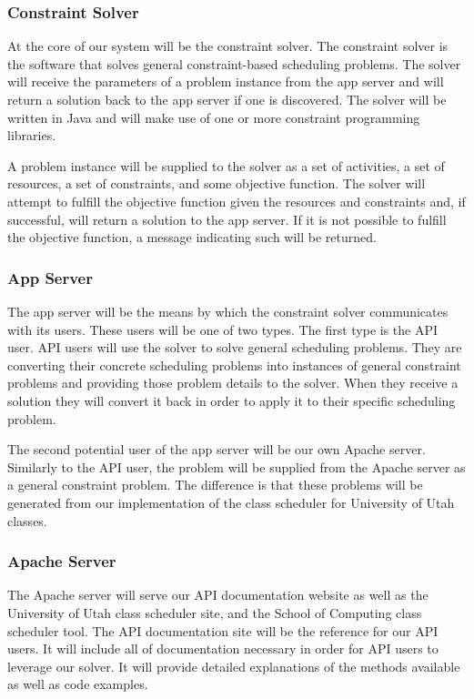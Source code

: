 \documentclass{extarticle}
\begin{document}
\subsubsection{Constraint Solver}
At the core of our system will be the constraint solver.  The constraint solver is the software that solves general
constraint-based scheduling problems.  The solver will receive the parameters of a problem instance from the app
server and will return a solution back to the app server if one is discovered.  The solver will be written in Java
and will make use of one or more constraint programming libraries.

A problem instance will be supplied to the solver as a set of activities, a set of resources, a set of constraints,
and some objective function.  The solver will attempt to fulfill the objective function given the resources and
constraints and, if successful, will return a solution to the app server.  If it is not possible to fulfill the
objective function, a message indicating such will be returned.

\subsubsection{App Server}
The app server will be the means by which the constraint solver communicates with its users.  These users will be
one of two types.  The first type is the API user.  API users will use the solver to solve general scheduling
problems.  They are converting their concrete scheduling problems into instances of general constraint problems and
providing those problem details to the solver.  When they receive a solution they will convert it back in order to
apply it to their specific scheduling problem.

The second potential user of the app server will be our own Apache server.  Similarly to the API user, the problem
will be supplied from the Apache server as a general constraint problem.  The difference is that these problems will
be generated from our implementation of the class scheduler for University of Utah classes.

\subsubsection{Apache Server}
The Apache server will serve our API documentation website as well as the University of Utah class scheduler site,
and the School of Computing class scheduler tool.  The API documentation site will be the reference for our API
users.  It will include all of documentation necessary in order for API users to leverage our solver.  It will
provide detailed explanations of the methods available as well as code examples.
\end{document}
